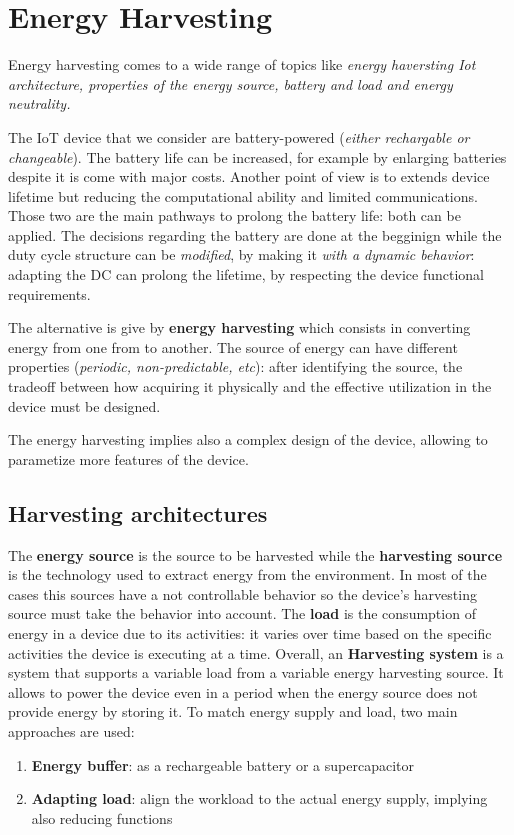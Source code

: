 \documentclass[10pt,a4paper]{report}
\theoremstyle{definition}
\begin{document}
\chapter{Energy Harvesting}\label{sec:energy-harvesting}
Energy harvesting comes to a wide range of topics like \textit{energy haversting Iot architecture, properties of the energy source, battery and load and energy neutrality.}

The IoT device that we consider are battery-powered (\textit{either rechargable or changeable}). The battery life can be increased, for example by enlarging batteries despite it is come with major costs.
Another point of view is to extends device lifetime but reducing the computational ability and limited communications.
Those two are the main pathways to prolong the battery life: both can be applied.
The decisions regarding the battery are done at the begginign while the duty cycle structure can be \textit{modified}, by making it \textit{with a dynamic behavior}: adapting the DC can prolong the lifetime, by respecting the device functional requirements.

The alternative is give by \textbf{energy harvesting} which consists in converting energy from one from to another.  The source of energy can have different properties (\textit{periodic, non-predictable, etc}): after identifying the source, the tradeoff between how acquiring it physically and the effective utilization in the device must be designed.

The energy harvesting implies also a complex design of the device, allowing to parametize more features of the device.

\section{Harvesting architectures}\label{sec:harvesting-architectures}
The \textbf{energy source} is the source to be harvested while the \textbf{harvesting source} is the technology used to extract energy from the environment. In most of the cases this sources have a not controllable behavior so the device's harvesting source must take the behavior into account.
The \textbf{load} is the consumption of energy in a device due to its activities: it varies over time based on the specific activities the device is executing at a time.
Overall, an \textbf{Harvesting system} is a system that supports a variable load from a variable energy harvesting source. It allows to power the device even in a period when the energy source does not provide energy by storing it.
To match energy supply and load, two main approaches are used:
\begin{enumerate}
	\item 
	\textbf{Energy buffer}: as a rechargeable battery or a supercapacitor
	\item 
	\textbf{Adapting load}: align the workload to the actual energy supply, implying also reducing functions
\end{enumerate}
\end{document}
